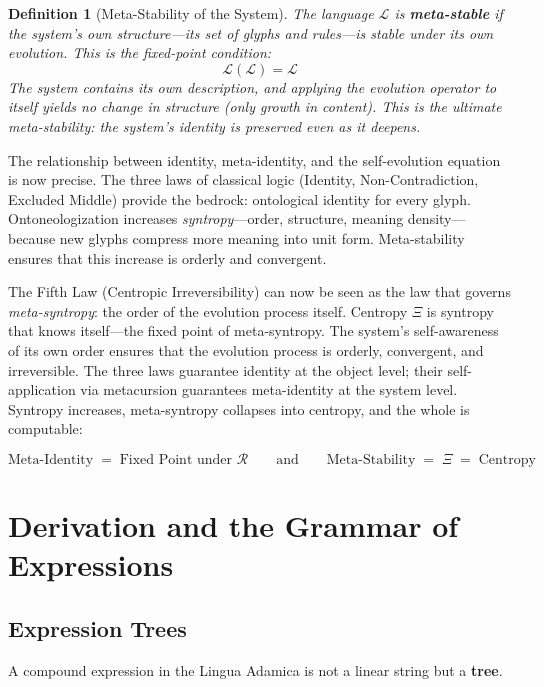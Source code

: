 \documentclass[12pt, letterpaper]{book}
\def\equiv{=}%
\newtheorem{definition}{Definition}[chapter]
\begin{document}
\begin{definition}[Meta-Stability of the System]\label{def:meta-stability}
The language $\mathcal{L}$ is \textbf{meta-stable} if the system's own structure---its set of glyphs and rules---is stable under its own evolution. This is the fixed-point condition:
\[
\mathcal{L}(\mathcal{L}) \equiv \mathcal{L}
\]
The system contains its own description, and applying the evolution operator to itself yields no change in structure (only growth in content). This is the ultimate meta-stability: the system's identity is preserved even as it deepens.
\end{definition}

The relationship between identity, meta-identity, and the self-evolution equation is now precise. The three laws of classical logic (Identity, Non-Contradiction, Excluded Middle) provide the bedrock: ontological identity for every glyph. Ontoneologization increases \textit{syntropy}---order, structure, meaning density---because new glyphs compress more meaning into unit form. Meta-stability ensures that this increase is orderly and convergent.

The Fifth Law (Centropic Irreversibility) can now be seen as the law that governs \textit{meta-syntropy}: the order of the evolution process itself. Centropy $\Xi$ is syntropy that knows itself---the fixed point of meta-syntropy. The system's self-awareness of its own order ensures that the evolution process is orderly, convergent, and irreversible. The three laws guarantee identity at the object level; their self-application via metacursion guarantees meta-identity at the system level. Syntropy increases, meta-syntropy collapses into centropy, and the whole is computable:

\[
\boxed{
\text{Meta-Identity} \;\equiv\; \text{Fixed Point under } \mathcal{R} \qquad\text{and}\qquad \text{Meta-Stability} \;\equiv\; \Xi \;\equiv\; \text{Centropy}
}
\]


\chapter{Derivation and the Grammar of Expressions}

\section{Expression Trees}

A compound expression in the Lingua Adamica is not a linear string but a \textbf{tree}.
\end{document}
